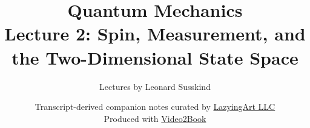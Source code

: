 \documentclass[11pt,oneside]{book}
\begin{document}
\hypersetup{pageanchor=false}
\frontmatter
\title{Quantum Mechanics\\[0.45em]
\large Lecture 2: Spin, Measurement, and the Two-Dimensional State Space}
\author{Lectures by Leonard Susskind}
\date{Transcript-derived companion notes curated by
\href{https://lazying.art}{LazyingArt LLC}\\[0.35em]
\small Produced with
\href{https://github.com/lachlanchen/Video2Book}{Video2Book}}
\maketitle
\hypersetup{pageanchor=true}
\mainmatter

\end{document}
